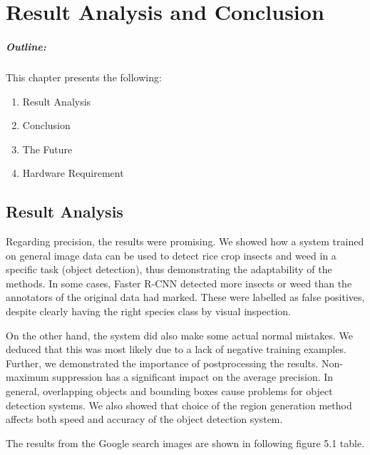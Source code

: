 \chapter{Result Analysis and Conclusion }\label{chap5}


\vspace*{40 ex}

\paragraph*{Outline:} This chapter presents the following:
\begin{enumerate}
	\setlength{\itemsep}{-0.3em}
	\item Result Analysis
	\item Conclusion
	\item The Future
	\item Hardware Requirement
\end{enumerate}

\newpage

\section{Result Analysis}
Regarding precision, the results were promising. We showed how a system trained on general image data can be used to detect rice crop insects and weed in a specific task (object detection), thus demonstrating the adaptability of the methods. In some cases, Faster R-CNN detected more insects or weed than the annotators of the original data had marked. These were labelled as false positives, despite clearly having the right species class by visual inspection.

On the other hand, the system did also make some actual normal mistakes. We deduced that this was most likely due to a lack of negative training examples. Further, we demonstrated the importance of postprocessing the results. Non-maximum suppression has a significant impact on the average precision. In general, overlapping objects and bounding boxes cause problems for object detection systems. We also showed that choice of the region generation method affects both speed and accuracy of the object detection system.

The results from the Google search images are shown in following figure 5.1 table.

